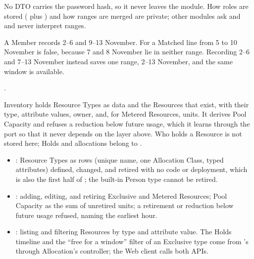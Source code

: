No DTO carries the password hash, so it never leaves the module. How roles are stored ( plus ) and how ranges are merged are private; other modules ask  and  and never interpret ranges.

A Member records 2--6 and 9--13 November. For a Matched line from 5 to 10 November  is false, because 7 and 8 November lie in neither range. Recording 2--6 and 7--13 November instead saves one range, 2--13 November, and the same window is available.

.


Inventory holds Resource Types as data and the Resources that exist, with their type, attribute values, owner, and, for Metered Resources, units. It derives Pool Capacity and refuses a reduction below future usage, which it learns through the port  so that it never depends on the layer above. Who holds a Resource is not stored here; Holds and allocations belong to .

\begin{itemize}
\item {}: Resource Types as rows (unique name, one Allocation Class, typed attributes) defined, changed, and retired with no code or deployment, which is also the first half of ; the built-in Person type cannot be retired.
\item {}: adding, editing, and retiring Exclusive and Metered Resources; Pool Capacity as the sum of unretired units; a retirement or reduction below future usage refused, naming the earliest hour.
\item {}: listing and filtering Resources by type and attribute value. The Holds timeline and the ``free for a window'' filter of an Exclusive type come from 's  through Allocation's controller; the Web client calls both APIs.
\end{itemize}

